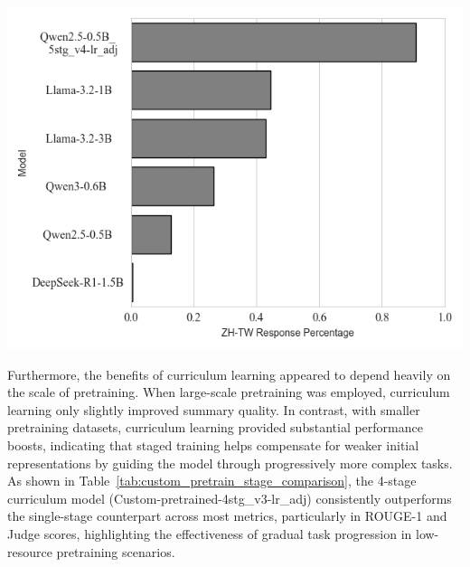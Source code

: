 \includegraphics[width=\columnwidth]{figures/zh_tw_result_percentage_overall.png}
\label{fig:zh_tw_result}

Furthermore, the benefits of curriculum learning appeared to depend heavily on the scale of pretraining. When large-scale pretraining was employed, curriculum learning only slightly improved summary quality. In contrast, with smaller pretraining datasets, curriculum learning provided substantial performance boosts, indicating that staged training helps compensate for weaker initial representations by guiding the model through progressively more complex tasks. As shown in Table~\ref{tab:custom_pretrain_stage_comparison}, the 4-stage curriculum model (Custom-pretrained-4stg\_v3-lr\_adj) consistently outperforms the single-stage counterpart across most metrics, particularly in ROUGE-1 and Judge scores, highlighting the effectiveness of gradual task progression in low-resource pretraining scenarios.



